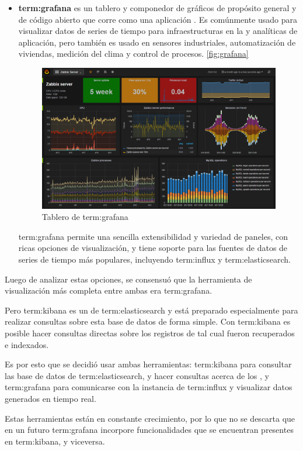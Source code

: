 \begin{itemize}
\item
\textbf{\gls{term:grafana}} es un tablero y componedor de gráficos de propósito
general y de código abierto que corre como una aplicación . Es
comúnmente usado para visualizar datos de series de tiempo para infraestructuras
en la  y analíticas de aplicación, pero también es usado en sensores
industriales, automatización de viviendas, medición del clima y control de
procesos. \autoref{fig:grafana}

\begin{figure}
  \includegraphics[width=\linewidth]{src/images/05-capitulo-5/grafana.png}
  \caption{Tablero de \gls{term:grafana}}
  \label{fig:grafana}
\end{figure}

\gls{term:grafana} permite una sencilla extensibilidad y variedad de paneles,
con ricas opciones de visualización, y tiene soporte para las fuentes de datos
de series de tiempo más populares, incluyendo \gls{term:influx} y
\gls{term:elasticsearch}.

\end{itemize}

Luego de analizar estas opciones, se consensuó que la herramienta de
visualización más completa entre ambas era \gls{term:grafana}.

Pero \gls{term:kibana} es un  de \gls{term:elasticsearch} y está
preparado especialmente para realizar consultas sobre esta base de datos de
forma simple. Con \gls{term:kibana} es posible hacer consultas directas sobre
los registros de  tal cual fueron recuperados e indexados.

Es por esto que se decidió usar ambas herramientas: \gls{term:kibana} para
consultar las base de datos de \gls{term:elasticsearch}, y hacer consultas
acerca de los , y \gls{term:grafana} para comunicarse con la instancia
de \gls{term:influx} y visualizar datos generados en tiempo real.

Estas herramientas están en constante crecimiento, por lo que no se descarta que
en un futuro \gls{term:grafana} incorpore funcionalidades que se encuentran
presentes en \gls{term:kibana}, y viceversa.
